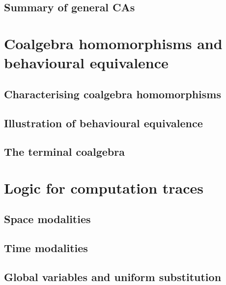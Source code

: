 \documentclass[10pt, letterpaper]{article}
\begin{document}
    \subsection{Summary of general CAs}
    \label{sec:disunif_reflection}
    

    \section{Coalgebra homomorphisms and behavioural equivalence}
    \label{sec:disunif_coalg_homoms}
    
    \subsection{Characterising coalgebra homomorphisms}
    
    \subsection{Illustration of behavioural equivalence}
    
    \subsection{The terminal coalgebra}
    


    \section{Logic for computation traces}
    \label{sec:basic_modal_log}
    
    \subsection{Space modalities}
    
    \subsection{Time modalities}
    
    \subsection{Global variables and uniform substitution}
    \label{sec:glob_vars}
    
\end{document}
